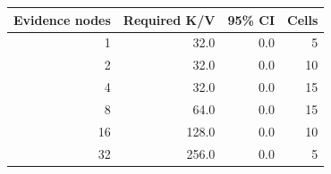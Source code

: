 \begin{tabular}{rrrr}
\toprule
Evidence nodes & Required K/V & 95\% CI & Cells \\
\midrule
1 & 32.0 & 0.0 & 5 \\
2 & 32.0 & 0.0 & 10 \\
4 & 32.0 & 0.0 & 15 \\
8 & 64.0 & 0.0 & 15 \\
16 & 128.0 & 0.0 & 10 \\
32 & 256.0 & 0.0 & 5 \\
\bottomrule
\end{tabular}
